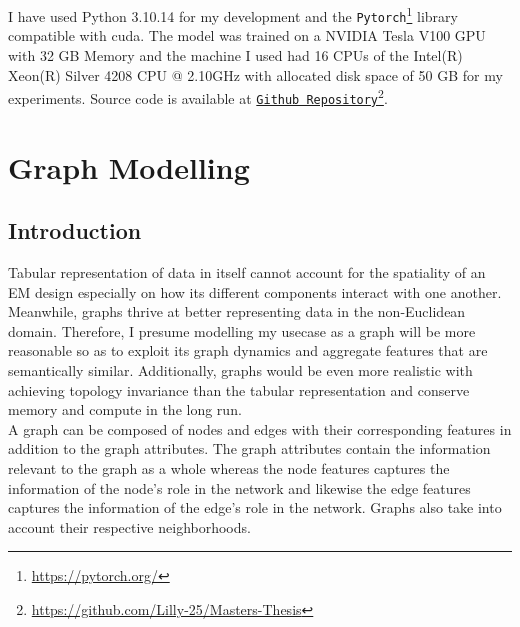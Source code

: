 \documentclass{report} %
\begin{document}
I have used Python 3.10.14 for my development and the \texttt{Pytorch}\footnote{\url{https://pytorch.org/}} library compatible with cuda.
The model was trained on a NVIDIA Tesla V100 \ac{GPU} with 32 GB Memory and the machine I used had 16 CPUs of the Intel(R) Xeon(R) Silver 4208 CPU @ 2.10GHz 
with allocated disk space of 50 GB for my experiments.
Source code is available at \texttt{\href{https://github.com/Lilly-25/Masters-Thesis}{Github Repository}}\footnote{\url{https://github.com/Lilly-25/Masters-Thesis}}.

\chapter{Graph Modelling} 

\section{Introduction}\label{sec:Introduction}

Tabular representation of data in itself cannot account for the spatiality of an \ac{EM} design especially on how its different components interact with one another. 
Meanwhile, graphs thrive at better representing data in the non-Euclidean domain.
Therefore, I presume modelling my usecase as a graph will be more reasonable so as to exploit its graph dynamics and aggregate features that are semantically similar.
Additionally, graphs would be even more realistic with achieving topology invariance than the tabular representation and conserve memory and compute in the long run.\\

A graph can be composed of nodes and edges with their corresponding features in addition to the graph attributes.
The graph attributes contain the information relevant to the graph as a whole whereas the node features captures the information of the node's role in the network and 
likewise the edge features captures the information of the edge's role in the network. Graphs also take into account their respective neighborhoods.\\

\end{document}
